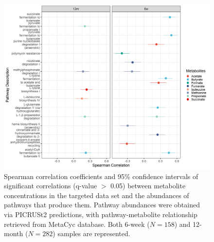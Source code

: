 \begin{figure}[!h]
    \centering
    \includegraphics[width=0.95\linewidth]{figures/appB_fs9.png}
    \caption[Spearman correlation coefficients and 95\% confidence intervals of significant correlations (q-value $<$ 0.05) between metabolite concentrations in the targeted data set and the abundances of pathways that produce them]{Spearman correlation coefficients and 95\% confidence intervals of significant correlations (q-value $>$ 0.05) between metabolite concentrations in the targeted data set and the abundances of pathways that produce them. Pathway abundances were obtained via PICRUSt2 predictions, with pathway-metabolite relationship retrieved from MetaCyc database. Both 6-week ($N = 158$) and 12-month ($N = 282$) samples are represented.}
    \label{fig:b9}
\end{figure}

